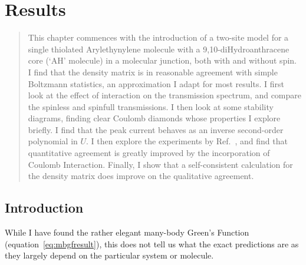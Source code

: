 \chapter{Results}
\label{ch:chapter_4}




\begin{abstract}
This chapter commences with the introduction of a two-site model for a single thiolated Arylethynylene molecule with a 9,10-diHydroanthracene
core (`AH' molecule) in a molecular junction, both with and without spin. I find that the density matrix is in reasonable agreement with simple Boltzmann statistics, an approximation I adapt for most results. I first look at the effect of interaction on the transmission spectrum, and compare the spinless and spinfull transmissions. I then look at some stability diagrams, finding clear Coulomb diamonds whose properties I explore briefly. I find that the peak current behaves as an inverse second-order polynomial in $U$. I then explore the experiments by Ref.~\cite{perrinnano}, and find that quantitative agreement is greatly improved by the incorporation of Coulomb Interaction. Finally, I show that a self-consistent calculation for the density matrix does improve on the qualitative agreement.
\end{abstract}

\newpage
\section{Introduction}
While I have found the rather elegant many-body Green's Function (equation~\ref{eq:mbgfresult}), this does not tell us what the exact predictions are as they largely depend on the particular system or molecule.


